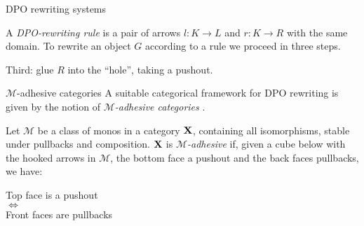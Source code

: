 \documentclass[aspectratio=169]{beamer}
\def\X{\textbf {\textup{X}}}
\begin{document}
\begin{frame}{DPO rewriting systems}
\begin{overprint}
	A \emph{DPO-rewriting rule} is a pair  of arrows $l:K\to L$ and $r:K\to R$ with the same domain. To rewrite an object $G$ according to a rule we proceed in three steps.
		
		\medskip
		Third: glue $R$ into the ``hole'',  taking a pushout.\vspace{-0.075cm}
		\begin{center}\hspace{0.08cm}
		\end{center}		
	\end{overprint}  	
\end{frame}




\begin{frame}{$\mathcal{M}$-adhesive categories}
	A suitable categorical framework for DPO rewriting is given by the notion of \emph{$\mathcal{M}$-adhesive categories} \cite{azzi2019essence,ehrig2014adhesive, lack2005adhesive}.
		
		\medskip \pause
		Let $\mathcal{M}$ be a class of monos in a category $\X$, containing all isomorphisms, stable under pullbacks and composition. $\X$ is \emph{$\mathcal{M}$-adhesive} if, given a cube below with the hooked arrows in $\mathcal{M}$, the bottom face a pushout and the back faces pullbacks, we have:
		
		\parbox{5cm}{\centering {}} \qquad 	\parbox{4cm}{\centering
			Top face is a pushout \\ $\iff$ \\ Front faces are pullbacks}
			

\end{frame}
\end{document}
